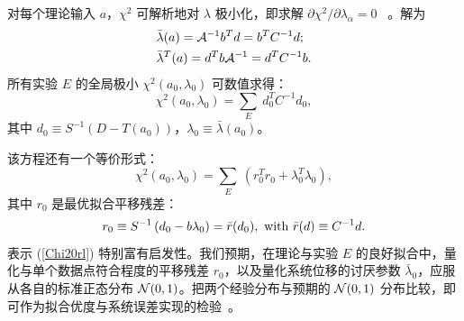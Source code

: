 对每个理论输入 $a$，$\chi^{2}$ 可解析地对 $\lambda$ 极小化，即求解 $\partial\chi^{2}/\partial\lambda_{\alpha}=0$
~\cite{Pumplin:2002vw}。解为
\begin{align}
 & \bar{\lambda}(a)=\mathcal{A}^{-1}b^{T}d=b^{T}C^{-1}d;\label{lambda0}\\
 & \bar{\lambda}^{T}(a)=d^{T}b\mathcal{A}^{-1}=d^{T}C^{-1}b.
\end{align}
 所有实验 $E$ 的全局极小 $\chi^{2}(a_{0},\lambda_{0})$ 可数值求得：
\begin{equation}
\chi^{2}(a_{0},\lambda_{0})=\sum_{E}\ d_{0}^{T}C^{-1}d_{0},\label{Chi2CovMat}
\end{equation}
 其中 $d_{0}\equiv S^{-1}\left(D-T(a_{0})\right)$，$\lambda_{0}\equiv\bar{\lambda}(a_{0})$。

该方程还有一个等价形式：
\begin{equation}
\chi^{2}(a_{0},\lambda_{0})=\sum_{E}\ \left(r_{0}^{T}r_{0}+\lambda_{0}^{T}\lambda_{0}\right),\label{Chi20rl}
\end{equation}
其中 $r_{0}$ 是最优拟合平移残差：
\begin{equation}
r_{0}\equiv S^{-1}\left(d_{0}-b\lambda_{0}\right)=\bar{r}(d_{0}),\mbox{~with~}\bar{r}(d)\equiv C^{-1}d.\label{r0}
\end{equation}
表示 (\ref{Chi20rl}) 特别富有启发性。我们预期，在理论与实验 $E$ 的良好拟合中，量化与单个数据点符合程度的平移残差 $r_{0}$，以及量化系统位移的讨厌参数 $\bar{\lambda}_{0}$，应服从各自的标准正态分布 ${\cal N}(0,1)$。把两个经验分布与预期的 ${\cal N}(0,1)$ 分布比较，即可作为拟合优度与系统误差实现的检验~\cite{Kovarik:2019xvh}。

